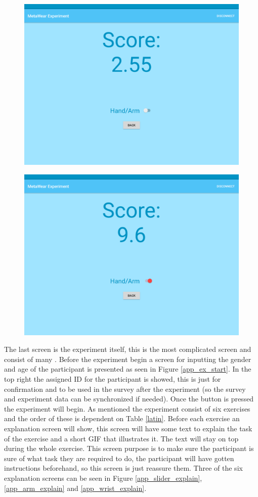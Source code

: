 \begin{figure}[h!]
    \centering
    \includegraphics[width=0.6\linewidth]{figures/tablet_screen3.png}
  \label{app_train_wrist}
\end{figure}

\begin{figure}[h!]
    \centering
  \includegraphics[width=0.6\linewidth]{figures/tablet_screen4.png}
  \label{app_train_arm}
\end{figure}


The last screen is the experiment itself, this is the most complicated screen and consist of many . Before the experiment begin a screen for inputting the gender and age of the participant is presented as seen in Figure \ref{app_ex_start}. In the top right the assigned ID for the participant is showed, this is just for confirmation and to be used in the survey after the experiment (so the survey and experiment data can be synchronized if needed). Once the  button is pressed the experiment will begin. As mentioned the experiment consist of six exercises and the order of these is dependent on Table \ref{latin}. Before each exercise an explanation screen will show, this screen will have some text to explain the task of the exercise and a short GIF that illustrates it. The text will stay on top during the whole exercise. This screen purpose is to make sure the participant is sure of what task they are required to do, the participant will have gotten instructions beforehand, so this screen is just reassure them. Three of the six explanation screens can be seen in Figure \ref{app_slider_explain}, \ref{app_arm_explain} and \ref{app_wrist_explain}.


